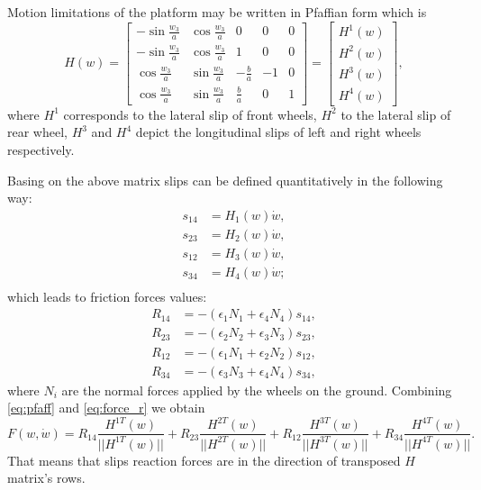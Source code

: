 Motion limitations of the platform may be written in Pfaffian form which is 
\begin{equation}
\label{eq:pfaff}
H(w)=\begin{bmatrix}
-\sin\frac{w_3}{a} & \cos\frac{w_3}{a} & 0 & 0 & 0\\
-\sin\frac{w_3}{a} & \cos\frac{w_3}{a} & 1 & 0 & 0\\
 \cos\frac{w_3}{a} & \sin\frac{w_3}{a} & -\frac{b}{a} & -1 & 0\\
 \cos\frac{w_3}{a} & \sin\frac{w_3}{a} &  \frac{b}{a} &  0 & 1
\end{bmatrix} = \begin{bmatrix}
H^1(w)\\
H^2(w)\\
H^3(w)\\
H^4(w)
\end{bmatrix},
\end{equation}
where $H^1$ corresponds to the lateral slip of front wheels, $H^2$ to the lateral slip of rear wheel, $H^3$ and $H^4$ depict the longitudinal slips of left and right wheels respectively.

Basing on the above matrix slips can be defined quantitatively in the following way: 
\begin{align}
s_{14} &= H_1(w)\dot w,\\
s_{23} &= H_2(w)\dot w,\\
s_{12} &= H_3(w)\dot w,\\
s_{34} &= H_4(w)\dot w;\\
\end{align}
which leads to friction forces values:
\begin{align}
\label{eq:force_r}
R_{14}&=-(\epsilon_1 N_1 + \epsilon_4 N_4)s_{14},\\
R_{23}&=-(\epsilon_2 N_2 + \epsilon_3 N_3)s_{23},\\
R_{12}&=-(\epsilon_1 N_1 + \epsilon_2 N_2)s_{12},\\
R_{34}&=-(\epsilon_3 N_3 + \epsilon_4 N_4)s_{34},
\end{align}
where $N_i$ are the normal forces applied by the wheels on the ground.
Combining \eqref{eq:pfaff} and \eqref{eq:force_r} we obtain
\begin{equation}
F(w, \dot{w}) = R_{14}\frac{H^{1T}(w)}{||H^{1T}(w)||} + R_{23}\frac{H^{2T}(w)}{||H^{2T}(w)||} + R_{12}\frac{H^{3T}(w)}{||H^{3T}(w)||} + R_{34}\frac{H^{4T}(w)}{||H^{4T}(w)||}.
\end{equation}
That means that slips reaction forces are in the direction of transposed $H$ matrix's rows.

